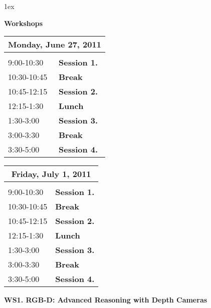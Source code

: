 {\parskip 1ex


{\huge {\bf Workshops}}\\[5mm]


\begin{tabular}{lp{13.8cm}}
\hline
\multicolumn{2}{|c|}{{\bf Monday, June 27, 2011}}\\
\hline\\
9:00-10:30 & {\bf Session 1. } \\[2mm]%
10:30-10:45 & {\bf Break}\\[2mm]
10:45-12:15 & {\bf Session 2. } \\[2mm]%
12:15-1:30 & {\bf Lunch}\\[2mm]
1:30-3:00 & {\bf Session 3. } \\[2mm]%
3:00-3:30 & {\bf Break}\\[2mm]
3:30-5:00 & {\bf Session 4. } \\[2mm]%
\end{tabular}


\begin{tabular}{lp{13.8cm}}
\hline
\multicolumn{2}{|c|}{{\bf Friday, July 1, 2011}}\\
\hline\\
9:00-10:30 & {\bf Session 1. } \\[2mm]%
10:30-10:45 & {\bf Break}\\[2mm]
10:45-12:15 & {\bf Session 2. } \\[2mm]%
12:15-1:30 & {\bf Lunch}\\[2mm]
1:30-3:00 & {\bf Session 3. } \\[2mm]%
3:00-3:30 & {\bf Break}\\[2mm]
3:30-5:00 & {\bf Session 4. } \\[2mm]%
\end{tabular}

\clearpage

{\Large {\bf  WS1.  RGB-D: Advanced Reasoning with Depth Cameras}}\\[5mm]

}

